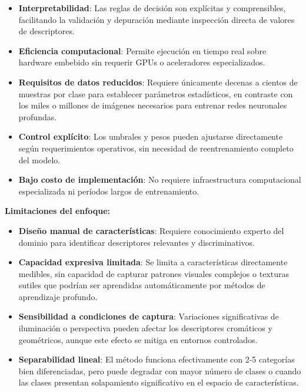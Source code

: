 \begin{itemize}
\item \textbf{Interpretabilidad}: Las reglas de decisión son explícitas y comprensibles, facilitando la validación y depuración mediante inspección directa de valores de descriptores.

\item \textbf{Eficiencia computacional}: Permite ejecución en tiempo real sobre hardware embebido sin requerir GPUs o aceleradores especializados.

\item \textbf{Requisitos de datos reducidos}: Requiere únicamente decenas a cientos de muestras por clase para establecer parámetros estadísticos, en contraste con los miles o millones de imágenes necesarios para entrenar redes neuronales profundas.

\item \textbf{Control explícito}: Los umbrales y pesos pueden ajustarse directamente según requerimientos operativos, sin necesidad de reentrenamiento completo del modelo.

\item \textbf{Bajo costo de implementación}: No requiere infraestructura computacional especializada ni períodos largos de entrenamiento.
\end{itemize}

\textbf{Limitaciones del enfoque:}

\begin{itemize}
\item \textbf{Diseño manual de características}: Requiere conocimiento experto del dominio para identificar descriptores relevantes y discriminativos.

\item \textbf{Capacidad expresiva limitada}: Se limita a características directamente medibles, sin capacidad de capturar patrones visuales complejos o texturas sutiles que podrían ser aprendidas automáticamente por métodos de aprendizaje profundo.

\item \textbf{Sensibilidad a condiciones de captura}: Variaciones significativas de iluminación o perspectiva pueden afectar los descriptores cromáticos y geométricos, aunque este efecto se mitiga en entornos controlados.

\item \textbf{Separabilidad lineal}: El método funciona efectivamente con 2-5 categorías bien diferenciadas, pero puede degradar con mayor número de clases o cuando las clases presentan solapamiento significativo en el espacio de características.
\end{itemize}

